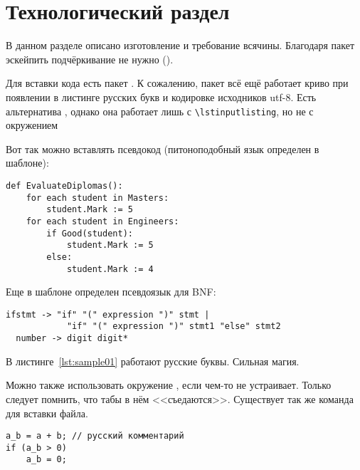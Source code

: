 \chapter{Технологический раздел}
\label{cha:impl}

В данном разделе описано изготовление и требование всячины. Благодаря пакет  эскейпить подчёркивание  не нужно ().

Для вставки кода есть пакет . К сожалению, пакет  всё ещё
работает криво при появлении в листинге русских букв и кодировке исходников utf-8. Есть
альтернатива , однако она работает лишь с
\texttt{\textbackslash lstinputlisting}, но не с окружением 

Вот так можно вставлять псевдокод (питоноподобный язык определен в шаблоне):

\begin{lstlisting}[style=pseudocode,caption={Алгоритм оценки дипломных работ}]
def EvaluateDiplomas():
    for each student in Masters:
        student.Mark := 5
    for each student in Engineers:
        if Good(student):
            student.Mark := 5
        else:
            student.Mark := 4
\end{lstlisting}

Еще в шаблоне определен псевдоязык для BNF:

\begin{lstlisting}[style=grammar,basicstyle=\small,caption={Грамматика}]
  ifstmt -> "if" "(" expression ")" stmt |
            "if" "(" expression ")" stmt1 "else" stmt2
  number -> digit digit*
\end{lstlisting}

В листинге~\ref{lst:sample01} работают русские буквы. Сильная магия.








Можно также использовать окружение , если  чем-то не
устраивает. Только следует помнить, что табы в нём <<съедаются>>. Существует так же команда  для вставки файла.

\begin{verbatim}
a_b = a + b; // русский комментарий
if (a_b > 0)
    a_b = 0;
\end{verbatim}


